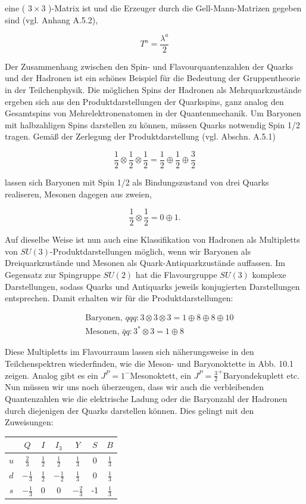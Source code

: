 \documentclass[10pt, letterpaper]{article}
\begin{document}
eine ( $3 \times 3$ )-Matrix ist und die Erzeuger durch die Gell-Mann-Matrizen gegeben sind (vgl. Anhang A.5.2),

$$
T^{a}=\frac{\lambda^{a}}{2}
$$

Der Zusammenhang zwischen den Spin- und Flavourquantenzahlen der Quarks und der Hadronen ist ein schönes Beispiel für die Bedeutung der Gruppentheorie in der Teilchenphysik. Die möglichen Spins der Hadronen als Mehrquarkzustände ergeben sich aus den Produktdarstellungen der Quarkspins, ganz analog den Gesamtspins von Mehrelektronenatomen in der Quantenmechanik. Um Baryonen mit halbzahligen Spins darstellen zu können, müssen Quarks notwendig Spin 1/2 tragen. Gemäß der Zerlegung der Produktdarstellung (vgl. Abschn. A.5.1)

$$
\frac{1}{2} \otimes \frac{1}{2} \otimes \frac{1}{2}=\frac{1}{2} \oplus \frac{1}{2} \oplus \frac{3}{2}
$$

lassen sich Baryonen mit Spin 1/2 als Bindungszustand von drei Quarks realiseren, Mesonen dagegen aus zweien,

$$
\frac{1}{2} \otimes \frac{1}{2}=0 \oplus 1 .
$$

Auf dieselbe Weise ist nun auch eine Klassifikation von Hadronen als Multipletts von $S U(3)$-Produktdarstellungen möglich, wenn wir Baryonen als Dreiquarkzustände und Mesonen als Quark-Antiquarkzustände auffassen. Im Gegensatz zur Spingruppe $S U(2)$ hat die Flavourgruppe $S U(3)$ komplexe Darstellungen, sodass Quarks und Antiquarks jeweils konjugierten Darstellungen entsprechen. Damit erhalten wir für die Produktdarstellungen:

$$
\begin{aligned}
& \text { Baryonen, } q q q: 3 \otimes 3 \otimes 3=1 \oplus 8 \oplus 8 \oplus 10 \\
& \text { Mesonen, } \bar{q} q: 3^{*} \otimes 3=1 \oplus 8
\end{aligned}
$$

Diese Multipletts im Flavourraum lassen sich näherungsweise in den Teilchenspektren wiederfinden, wie die Meson- und Baryonoktette in Abb. 10.1 zeigen. Analog gibt es ein $J^{P}=1^{-}$Mesonoktett, ein $J^{P}=\frac{3}{2}^{+}$Baryondekuplett etc. Nun müssen wir uns noch überzeugen, dass wir auch die verbleibenden Quantenzahlen wie die elektrische Ladung oder die Baryonzahl der Hadronen durch diejenigen der Quarks darstellen können. Dies gelingt mit den Zuweisungen:

\begin{center}
\begin{tabular}{c|cccccc}
 & $Q$ & $I$ & $I_{3}$ & $Y$ & $S$ & $B$ \\
\hline
$u$ & $\frac{2}{3}$ & $\frac{1}{2}$ & $\frac{1}{2}$ & $\frac{1}{3}$ & 0 & $\frac{1}{3}$ \\
$d$ & $-\frac{1}{3}$ & $\frac{1}{2}$ & $-\frac{1}{2}$ & $\frac{1}{3}$ & 0 & $\frac{1}{3}$ \\
$s$ & $-\frac{1}{3}$ & 0 & 0 & $-\frac{2}{3}$ & -1 & $\frac{1}{3}$ \\
\end{tabular}
\end{center}
\end{document}
